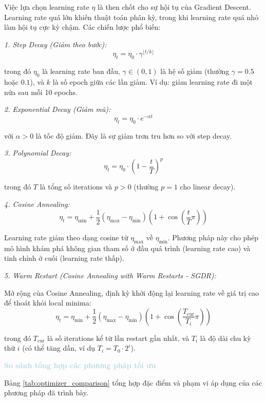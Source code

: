 Việc lựa chọn learning rate $\eta$ là then chốt cho sự hội tụ của Gradient Descent. Learning rate quá lớn khiến thuật toán phân kỳ, trong khi learning rate quá nhỏ làm hội tụ cực kỳ chậm. Các chiến lược phổ biến:

\noindent\textcolor{infocolor}{\textit{1. Step Decay (Giảm theo bước):}}
$$\eta_t = \eta_0 \cdot \gamma^{\lfloor t / k \rfloor}$$

trong đó $\eta_0$ là learning rate ban đầu, $\gamma \in (0, 1)$ là hệ số giảm (thường $\gamma = 0.5$ hoặc $0.1$), và $k$ là số epoch giữa các lần giảm. Ví dụ: giảm learning rate đi một nửa sau mỗi 10 epochs.

\noindent\textcolor{infocolor}{\textit{2. Exponential Decay (Giảm mũ):}}
$$\eta_t = \eta_0 \cdot e^{-\alpha t}$$

với $\alpha > 0$ là tốc độ giảm. Đây là sự giảm trơn tru hơn so với step decay.

\noindent\textcolor{infocolor}{\textit{3. Polynomial Decay:}}
$$\eta_t = \eta_0 \cdot \left(1 - \frac{t}{T}\right)^p$$

trong đó $T$ là tổng số iterations và $p > 0$ (thường $p = 1$ cho linear decay).

\noindent\textcolor{infocolor}{\textit{4. Cosine Annealing:}}
$$\eta_t = \eta_{\min} + \frac{1}{2}(\eta_{\max} - \eta_{\min})\left(1 + \cos\left(\frac{t}{T}\pi\right)\right)$$

Learning rate giảm theo dạng cosine từ $\eta_{\max}$ về $\eta_{\min}$. Phương pháp này cho phép mô hình khám phá không gian tham số ở đầu quá trình (learning rate cao) và tinh chỉnh ở cuối (learning rate thấp).

\noindent\textcolor{infocolor}{\textit{5. Warm Restart (Cosine Annealing with Warm Restarts - SGDR):}}

Mở rộng của Cosine Annealing, định kỳ khởi động lại learning rate về giá trị cao để thoát khỏi local minima:
$$\eta_t = \eta_{\min} + \frac{1}{2}(\eta_{\max} - \eta_{\min})\left(1 + \cos\left(\frac{T_{\text{cur}}}{T_i}\pi\right)\right)$$

trong đó $T_{\text{cur}}$ là số iterations kể từ lần restart gần nhất, và $T_i$ là độ dài chu kỳ thứ $i$ (có thể tăng dần, ví dụ $T_i = T_0 \cdot 2^i$).

\vspace{0.5em}
\noindent\textcolor{lightblue}{\textbf{So sánh tổng hợp các phương pháp tối ưu}}
\vspace{0.5em}

Bảng \ref{tab:optimizer_comparison} tổng hợp đặc điểm và phạm vi áp dụng của các phương pháp đã trình bày.


